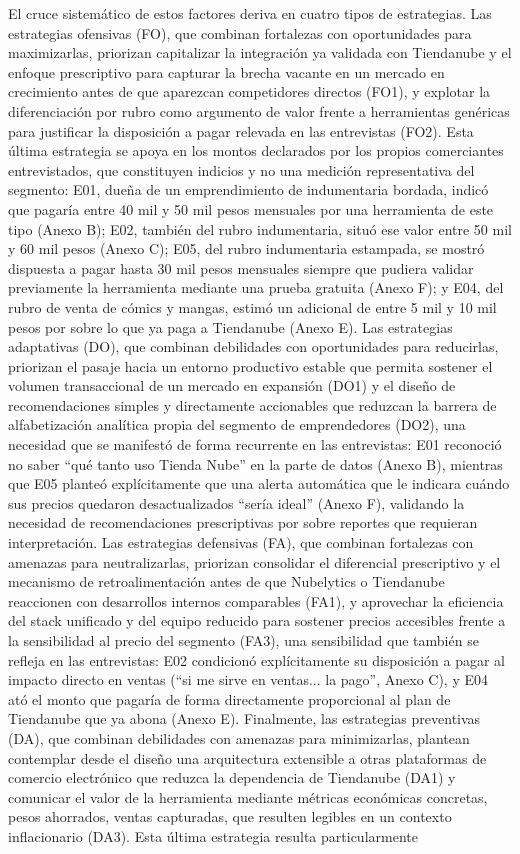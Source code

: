 El cruce sistemático de estos factores deriva en cuatro tipos de estrategias. Las estrategias ofensivas (FO), que combinan fortalezas con oportunidades para maximizarlas, priorizan capitalizar la integración ya validada con Tiendanube y el enfoque prescriptivo para capturar la brecha vacante en un mercado en crecimiento antes de que aparezcan competidores directos (FO1), y explotar la diferenciación por rubro como argumento de valor frente a herramientas genéricas para justificar la disposición a pagar relevada en las entrevistas (FO2). Esta última estrategia se apoya en los montos declarados por los propios comerciantes entrevistados, que constituyen indicios y no una medición representativa del segmento: E01, dueña de un emprendimiento de indumentaria bordada, indicó que pagaría entre 40 mil y 50 mil pesos mensuales por una herramienta de este tipo (Anexo B); E02, también del rubro indumentaria, situó ese valor entre 50 mil y 60 mil pesos (Anexo C); E05, del rubro indumentaria estampada, se mostró dispuesta a pagar hasta 30 mil pesos mensuales siempre que pudiera validar previamente la herramienta mediante una prueba gratuita (Anexo F); y E04, del rubro de venta de cómics y mangas, estimó un adicional de entre 5 mil y 10 mil pesos por sobre lo que ya paga a Tiendanube (Anexo E). Las estrategias adaptativas (DO), que combinan debilidades con oportunidades para reducirlas, priorizan el pasaje hacia un entorno productivo estable que permita sostener el volumen transaccional de un mercado en expansión (DO1) y el diseño de recomendaciones simples y directamente accionables que reduzcan la barrera de alfabetización analítica propia del segmento de emprendedores (DO2), una necesidad que se manifestó de forma recurrente en las entrevistas: E01 reconoció no saber \enquote{qué tanto uso Tienda Nube} en la parte de datos (Anexo B), mientras que E05 planteó explícitamente que una alerta automática que le indicara cuándo sus precios quedaron desactualizados \enquote{sería ideal} (Anexo F), validando la necesidad de recomendaciones prescriptivas por sobre reportes que requieran interpretación. Las estrategias defensivas (FA), que combinan fortalezas con amenazas para neutralizarlas, priorizan consolidar el diferencial prescriptivo y el mecanismo de retroalimentación antes de que Nubelytics o Tiendanube reaccionen con desarrollos internos comparables (FA1), y aprovechar la eficiencia del stack unificado y del equipo reducido para sostener precios accesibles frente a la sensibilidad al precio del segmento (FA3), una sensibilidad que también se refleja en las entrevistas: E02 condicionó explícitamente su disposición a pagar al impacto directo en ventas (\enquote{si me sirve en ventas... la pago}, Anexo C), y E04 ató el monto que pagaría de forma directamente proporcional al plan de Tiendanube que ya abona (Anexo E). Finalmente, las estrategias preventivas (DA), que combinan debilidades con amenazas para minimizarlas, plantean contemplar desde el diseño una arquitectura extensible a otras plataformas de comercio electrónico que reduzca la dependencia de Tiendanube (DA1) y comunicar el valor de la herramienta mediante métricas económicas concretas, pesos ahorrados, ventas capturadas, que resulten legibles en un contexto inflacionario (DA3). Esta última estrategia resulta particularmente 